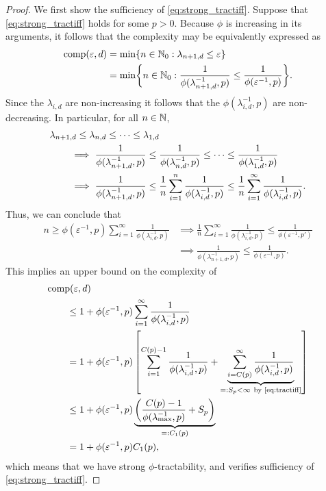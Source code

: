 \documentclass[11pt,a4paper]{article}
\begin{document}
\begin{proof}
We first show the sufficiency of \eqref{eq:strong_tractiff}. Suppose that \eqref{eq:strong_tractiff} holds for some $p>0$.  
Because $\phi$ is increasing in its arguments, it follows that the complexity may be equivalently expressed as 
\begin{align*}
    \operatorname{comp}(\varepsilon, d) &= \min \{n \in \mathbb{N}_{0} : \lambda_{n+1, d} \le \varepsilon\} \\
    &= \min \biggl\{n \in \mathbb{N}_{0} : \frac{1}{\phi(\lambda_{n+1, d}^{-1},p)} \le \frac{1}{\phi(\varepsilon^{-1},p)} \biggr\}.
\end{align*}
Since the $\lambda_{i,d}$ are non-increasing it follows that the $\phi(\lambda_{i, d}^{-1},p)$ are non-decreasing. 
In particular, for all $n \in \mathbb{N}$,
\begin{align*}
    \MoveEqLeft{\lambda_{n+1,d} \le \lambda_{n,d} \le \cdots \le \lambda_{1,d}} \\
    & \implies \frac{1}{\phi(\lambda_{n+1, d}^{-1},p)} \le \frac{1}{\phi(\lambda_{n, d}^{-1},p)} \le \cdots \le \frac{1}{\phi(\lambda_{1, d}^{-1},p)} \\
    & \implies \frac{1}{\phi(\lambda_{n+1, d}^{-1},p)} 
    \le \frac 1n \sum_{i=1}^n  \frac{1}{\phi(\lambda_{i, d}^{-1},p)} 
    \le \frac 1n \sum_{i=1}^\infty  \frac{1}{\phi(\lambda_{i, d}^{-1},p)}.
\end{align*}
Thus, we can conclude that 
\begin{align*}
    n \ge \phi(\varepsilon^{-1},p) \sum_{i=1}^\infty \frac{1}{\phi(\lambda_{i, d}^{-1},p)}
    & \implies 
  \frac 1n \sum_{i=1}^\infty \frac{1}{\phi(\lambda_{i, d}^{-1},p)} \le  \frac{1}{\phi(\varepsilon^{-1},p')} \\
   & \implies   \frac{1}{\phi(\lambda_{n+1, d}^{-1},p)} \le \frac{1}{\phi(\varepsilon^{-1},p)}.
\end{align*}
This implies an upper bound on the complexity of
\begin{align*}
       \MoveEqLeft{\comp(\varepsilon,d)} \\
       &\le 1 + \phi(\varepsilon^{-1},p) \sum_{i=1}^\infty \frac{1}{\phi(\lambda_{i, d}^{-1},p)} \\
       & = 1 + \phi(\varepsilon^{-1}, p) \left [ \sum_{i=1}^{C(p)-1} \frac{1}{\phi(\lambda_{i, d}^{-1},p)}  
       + \underbrace{\sum_{i=C(p)}^\infty \frac{1}{\phi(\lambda_{i, d}^{-1},p)}}_{=:S_p <\infty\ \text{by \eqref{eq:tractiff}} }\right] \\
       & \le 1+ \phi(\varepsilon^{-1},p) \underbrace{\left(\frac{C(p)-1}{\phi(\lambda_{\max}^{-1},p)} + S_p\right)}_{=:C_1(p)}\\
       & = 1+ \phi(\varepsilon^{-1},p) C_1 (p),
\end{align*}
which means that we have strong $\phi$-tractability, and verifies sufficiency of \eqref{eq:strong_tractiff}. 


\end{proof}
\end{document}
